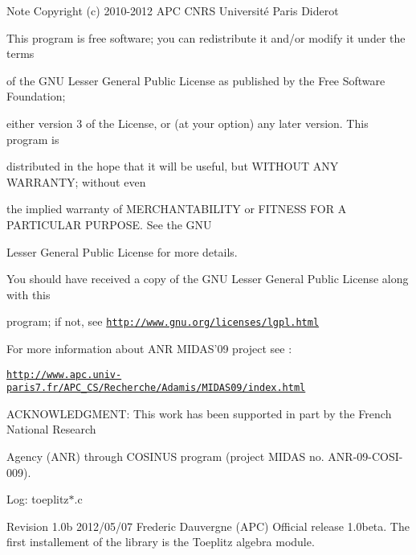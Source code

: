 \begin{DoxyNote}{Note}
Copyright (c) 2010-\/2012 A\-P\-C C\-N\-R\-S Université Paris Diderot 



This program is free software; you can redistribute it and/or modify it under the terms 

of the G\-N\-U Lesser General Public License as published by the Free Software Foundation; 

either version 3 of the License, or (at your option) any later version. This program is 

distributed in the hope that it will be useful, but W\-I\-T\-H\-O\-U\-T A\-N\-Y W\-A\-R\-R\-A\-N\-T\-Y; without even 

the implied warranty of M\-E\-R\-C\-H\-A\-N\-T\-A\-B\-I\-L\-I\-T\-Y or F\-I\-T\-N\-E\-S\-S F\-O\-R A P\-A\-R\-T\-I\-C\-U\-L\-A\-R P\-U\-R\-P\-O\-S\-E. See the G\-N\-U 

Lesser General Public License for more details. 



You should have received a copy of the G\-N\-U Lesser General Public License along with this 

program; if not, see \href{http://www.gnu.org/licenses/lgpl.html}{\tt http\-://www.\-gnu.\-org/licenses/lgpl.\-html} 



For more information about A\-N\-R M\-I\-D\-A\-S'09 project see \-: 

\href{http://www.apc.univ-paris7.fr/APC_CS/Recherche/Adamis/MIDAS09/index.html}{\tt http\-://www.\-apc.\-univ-\/paris7.\-fr/\-A\-P\-C\-\_\-\-C\-S/\-Recherche/\-Adamis/\-M\-I\-D\-A\-S09/index.\-html} 



A\-C\-K\-N\-O\-W\-L\-E\-D\-G\-M\-E\-N\-T\-: This work has been supported in part by the French National Research 

Agency (A\-N\-R) through C\-O\-S\-I\-N\-U\-S program (project M\-I\-D\-A\-S no. A\-N\-R-\/09-\/\-C\-O\-S\-I-\/009).
\end{DoxyNote}
Log\-: toeplitz$\ast$.c

Revision 1.\-0b 2012/05/07 Frederic Dauvergne (A\-P\-C) Official release 1.\-0beta. The first installement of the library is the Toeplitz algebra module.


